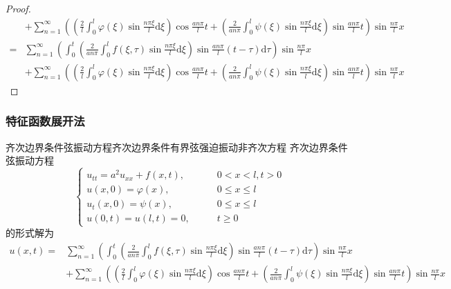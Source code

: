 \documentclass[lang = cn, scheme = chinese, thmcnt = section]{elegantbook}
\newcommand{\dd}{\mathrm{d}}           %
\begin{document}
\begin{proof}
\begin{align*}
		& + \sum_{n=1}^{\infty}\left(\left(\frac{2}{l}\int_0^l\varphi(\xi)\sin\frac{n\pi \xi}{l}\dd \xi\right)\cos\frac{an\pi}{l}t+\left(\frac{2}{an\pi}\int_0^l\psi(\xi)\sin\frac{n\pi \xi}{l}\dd \xi\right)\sin \frac{an\pi}{l}t\right)\sin\frac{n\pi}{l}x\\
		= & \sum_{n=1}^{\infty}\left(\int_{0}^{t}\left(\frac{2}{an\pi}\int_0^lf(\xi,\tau)\sin\frac{n\pi \xi}{l}\dd \xi\right)\sin \frac{an\pi}{l}(t-\tau)\dd \tau\right)\sin\frac{n\pi}{l}x\\
		& + \sum_{n=1}^{\infty}\left(\left(\frac{2}{l}\int_0^l\varphi(\xi)\sin\frac{n\pi \xi}{l}\dd \xi\right)\cos\frac{an\pi}{l}t+\left(\frac{2}{an\pi}\int_0^l\psi(\xi)\sin\frac{n\pi \xi}{l}\dd \xi\right)\sin \frac{an\pi}{l}t\right)\sin\frac{n\pi}{l}x
	\end{align*}
\end{proof}

\subsubsection{特征函数展开法}

\begin{theorem}{齐次边界条件弦振动方程}{齐次边界条件有界弦强迫振动非齐次方程}
	齐次边界条件弦振动方程
	$$
	\begin{cases}
		u_{tt}=a^2u_{xx}+f(x,t),\qquad & 0<x<l,t>0\\
		u(x,0)=\varphi(x),\qquad & 0\le x \le l\\
		u_t(x,0)=\psi(x),\qquad & 0\le x \le l\\
		u(0,t)=u(l,t)=0,\qquad & t\ge 0
	\end{cases}
	$$
	的形式解为
	\begin{align*}
		u(x,t)
		= & \sum_{n=1}^{\infty}\left(\int_{0}^{t}\left(\frac{2}{an\pi}\int_0^lf(\xi,\tau)\sin\frac{n\pi \xi}{l}\dd \xi\right)\sin \frac{an\pi}{l}(t-\tau)\dd \tau\right)\sin\frac{n\pi}{l}x\\
		& + \sum_{n=1}^{\infty}\left(\left(\frac{2}{l}\int_0^l\varphi(\xi)\sin\frac{n\pi \xi}{l}\dd \xi\right)\cos\frac{an\pi}{l}t+\left(\frac{2}{an\pi}\int_0^l\psi(\xi)\sin\frac{n\pi \xi}{l}\dd \xi\right)\sin \frac{an\pi}{l}t\right)\sin\frac{n\pi}{l}x
	\end{align*}
\end{theorem}
\end{document}
